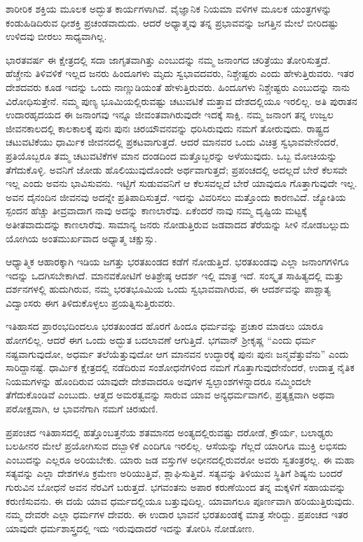 ಶಾರೀರಿಕ ಶಕ್ತಿಯ ಮೂಲಕ ಅದ್ಭುತ ಕಾರ್ಯಗಳಾಗಿವೆ. ವೈಜ್ಞಾನಿಕ ನಿಯಮಾ ವಳಿಗಳ ಮೂಲಕ ಯಂತ್ರಗಳನ್ನು ಕಂಡುಹಿಡಿದಿರುವ ಧೀಶಕ್ತಿ ಪ್ರಚಂಡವಾದುದು. ಆದರೆ ಅಧ್ಯಾತ್ಮವು ತನ್ನ ಪ್ರಭಾವವನ್ನು ಜಗತ್ತಿನ ಮೇಲೆ ಬೀರಿದಷ್ಟು ಉಳಿದವು ಬೀರಲು ಸಾಧ್ಯವಾಗಿಲ್ಲ. 

ಭಾರತವರ್ಷ ಈ ಕ್ಷೇತ್ರದಲ್ಲಿ ಸದಾ ಜಾಗೃತವಾಗಿತ್ತು ಎಂಬುದನ್ನು ನಮ್ಮ ಜನಾಂಗದ ಚರಿತ್ರೆಯು ತೋರಿಸುತ್ತದೆ. ಹೆಚ್ಚೇನು ತಿಳಿವಳಿಕೆ ಇಲ್ಲದ ಜನರು ಹಿಂದೂಗಳು ಮೃದು ಸ್ವಭಾವದವರು, ನಿಶ್ಚೇಷ್ಟರು ಎಂದು ಹೇಳುತ್ತಿರುವರು. ಇತರ ದೇಶದವರು ಕೂಡ ಇದನ್ನು ಒಂದು ನಾಣ್ಣುಡಿಯಂತೆ ಹೇಳುತ್ತಿರುವರು. ಹಿಂದೂಗಳು ನಿಶ್ಚೇಷ್ಟರು ಎಂಬುದನ್ನು ನಾನು ವಿರೋಧಿಸುತ್ತೇನೆ. ನಮ್ಮ ಪುಣ್ಯ ಭೂಮಿಯಲ್ಲಿರುವಷ್ಟು ಚಟುವಟಿಕೆ ಮತ್ತಾವ ದೇಶದಲ್ಲಿಯೂ ಇರಲಿಲ್ಲ. ಅತಿ ಪುರಾತನ ಉದಾರಹೃದಯದ ಈ ಜನಾಂಗವು ಇನ್ನೂ ಜೀವಂತವಾಗಿರುವುದೇ ಇದಕ್ಕೆ ಸಾಕ್ಷಿ. ನಮ್ಮ ಜನಾಂಗ ತನ್ನ ಉಜ್ವಲ ಜೀವನಕಾಲದಲ್ಲಿ ಕಾಲಕಾಲಕ್ಕೆ ಪುನಃ ಪುನಃ ಚಿರ\-ಯೌವನವನ್ನು ಧರಿಸಿರುವುದು ನಮಗೆ ತೋರುವುದು. ರಾಷ್ಟ್ರದ ಚಟುವಟಿಕೆಯು ಧಾರ್ಮಿಕ ಜೀವನದಲ್ಲಿ ಪ್ರಕಟವಾಗುತ್ತದೆ. ಆದರೆ ಮಾನವರ ಒಂದು ವಿಚಿತ್ರ ಸ್ವಭಾವವೇನೆಂದರೆ, ಪ್ರತಿಯೊಬ್ಬರೂ ತಮ್ಮ ಚಟುವಟಿಕೆಗಳ ಮಾನ ದಂಡದಿಂದ ಮತ್ತೊಬ್ಬರನ್ನು ಅಳೆಯುವುದು. ಒಬ್ಬ ಮೋಚಿಯನ್ನು ತೆಗೆದುಕೊಳ್ಳಿ. ಅವನಿಗೆ ಜೋಡು ಹೊಲಿಯುವುದೊಂದೇ ಅರ್ಥವಾಗುತ್ತದೆ; ಪ್ರಪಂಚದಲ್ಲಿ ಅದಲ್ಲದೆ ಬೇರೆ ಕೆಲಸವೇ ಇಲ್ಲ ಎಂದು ಅವನು ಭಾವಿಸುವನು. ಇಟ್ಟಿಗೆ ಸುಡುವವನಿಗೆ ಆ ಕೆಲಸವಲ್ಲದೆ ಬೇರೆ ಯಾವುದೂ ಗೊತ್ತಾಗುವುದೇ ಇಲ್ಲ. ಅವನ ದೈನಂದಿನ ಜೀವನವು ಅದನ್ನೇ ಪ್ರತಿಪಾದಿಸುತ್ತದೆ. ಇದನ್ನು ವಿವರಿಸಲು ಮತ್ತೊಂದು ಕಾರಣವಿದೆ. ಜ್ಯೋತಿಯ ಸ್ಪಂದನ ಹೆಚ್ಚು ತೀವ್ರವಾದಾಗ ನಾವು ಅದನ್ನು ಕಾಣಲಾರೆವು. ಏಕೆಂದರೆ ನಾವು ನಮ್ಮ ದೃಷ್ಟಿಯ ಮಟ್ಟಕ್ಕೆ ಅತೀತವಾದುದನ್ನು ಕಾಣಲಾರೆವು. ಸಾಮಾನ್ಯ ಜನರು ನೋಡುತ್ತಿರುವ ಜಡವಾದದ ತೆರೆಯನ್ನು ಸೀಳಿ ನೋಡಬಲ್ಲುದು ಯೋಗಿಯ ಅಂತಮುರ್ಖವಾದ ಅಧ್ಯಾತ್ಮ ಚಕ್ಷುಸ್ಸು. 

ಆಧ್ಯಾತ್ಮಿಕ ಆಹಾರಕ್ಕಾಗಿ ಇಡಿಯ ಜಗತ್ತು ಭರತಖಂಡದ ಕಡೆಗೆ ನೋಡುತ್ತಿದೆ. ಭರತಖಂಡವು ಎಲ್ಲಾ ಜನಾಂಗಗಳಿಗೂ ಇದನ್ನು ಒದಗಿಸಬೇಕಾಗಿದೆ. ಮಾನವಕೋಟಿಗೆ ಅತಿಶ್ರೇಷ್ಠ ಆದರ್ಶ ಇಲ್ಲಿ ಮಾತ್ರ ಇದೆ. ಸಂಸ್ಕೃತ ಸಾಹಿತ್ಯದಲ್ಲಿ ಮತ್ತು ದರ್ಶನಗಳಲ್ಲಿ ಹುದುಗಿರುವ, ನಮ್ಮ ಭರತಭೂಮಿಯ ಒಂದು ಸ್ವಭಾವವಾಗಿರುವ, ಈ ಆದರ್ಶವನ್ನು ಪಾಶ್ಚಾತ್ಯ ವಿದ್ವಾಂಸರು ಈಗ ತಿಳಿದುಕೊಳ್ಳಲು ಪ್ರಯತ್ನಿ\-ಸುತ್ತಿರುವರು. 

ಇತಿಹಾಸದ ಪ್ರಾರಂಭದಿಂದಲೂ ಭರತಖಂಡದ ಹೊರಗೆ ಹಿಂದೂ ಧರ್ಮವನ್ನು ಪ್ರಚಾರ ಮಾಡಲು ಯಾರೂ ಹೋಗಲಿಲ್ಲ. ಆದರೆ ಈಗ ಒಂದು ಅದ್ಭುತ ಬದಲಾವಣೆ ಆಗುತ್ತಿದೆ. ಭಗವಾನ್​ ಶ‍್ರೀಕೃಷ್ಣ “ಎಂದು ಧರ್ಮ ನಷ್ಟ\-ವಾಗು\-ವುದೋ, ಅಧರ್ಮ ತಲೆಯೆತ್ತುವುದೋ ಆಗ ಮಾನವನ ಉದ್ಧಾರಕ್ಕೆ ಪುನಃ ಪುನಃ ಜನ್ಮವೆತ್ತುವೆನು” ಎಂದು ಸಾರಿದ್ದಾನಷ್ಟೆ. ಧಾರ್ಮಿಕ ಕ್ಷೇತ್ರದಲ್ಲಿ ನಡೆದಿರುವ ಸಂಶೋಧನೆಗಳಿಂದ ನಮಗೆ ಗೊತ್ತಾಗುವುದೇನೆಂದರೆ, ಉದಾತ್ತ ನೈತಿಕ ನಿಯಮ\-ಗಳನ್ನು ಹೊಂದಿರುವ ಯಾವುದೇ ದೇಶವಾದರೂ ಅವುಗಳ ಸ್ವಲ್ಪಾಂಶಗಳನ್ನಾದರೂ ನಮ್ಮಿಂದಲೇ ತೆಗೆದುಕೊಂಡಿವೆ ಎಂಬುದು. ಆತ್ಮದ ಅಮರತ್ವವನ್ನು ಸಾರುವ ಯಾವ ಅನ್ಯಧರ್ಮವಾಗಲಿ, ಪ್ರತ್ಯಕ್ಷವಾಗಿ ಅಥವಾ ಪರೋಕ್ಷವಾಗಿ, ಆ ಭಾವನೆಗಾಗಿ ನಮಗೆ ಚಿರಋಣಿ. 

ಪ್ರಪಂಚದ ಇತಿಹಾಸದಲ್ಲಿ ಹತ್ತೊಂಬತ್ತನೆಯ ಶತಮಾನದ ಅಂತ್ಯದಲ್ಲಿರುವಷ್ಟು ದರೋಡೆ, ಕ್ರೌರ್ಯ, ಬಲಾಢ್ಯರು ಬಲಹೀನರ ಮೇಲೆ ಪ್ರಯೋಗಿಸುವ ದಬ್ಬಾಳಿಕೆ ಎಂದಿಗೂ ಇರಲಿಲ್ಲ. ಆಸೆಯನ್ನು ಗೆಲ್ಲದೆ ಯಾರಿಗೂ ಮುಕ್ತಿ ಲಭಿಸದು ಎಂಬುದನ್ನು ಎಲ್ಲರೂ ಅರಿಯಬೇಕು. ಯಾರು ಜಡ ವಸ್ತುಗಳ ಅಧೀನದಲ್ಲಿರುವರೋ ಅವರು ಸ್ವತಂತ್ರರಲ್ಲ. ಈ ಮಹಾ ಸತ್ಯವನ್ನು ಎಲ್ಲಾ ದೇಶಗಳೂ ಕ್ರಮೇಣ ಅರಿಯುತ್ತಿವೆ, ಶ್ಲಾಘಿಸುತ್ತಿವೆ. ಸತ್ಯವನ್ನು ತಿಳಿಯುವ ಸ್ಥಿತಿಗೆ ಶಿಷ್ಯನು ಬಂದರೆ ಗುರುವಿನ ಬೋಧನೆ ಅವನ ನೆರವಿಗೆ ಬರುತ್ತದೆ. ಭಗವಂತನು ಅಪಾರ ಕರುಣೆಯಿಂದ ತನ್ನ ಮಕ್ಕಳಿಗೆ ಸಹಾಯವನ್ನು ಕರುಣಿಸುವನು. ಈ ದಯೆ ಯಾವ ಧರ್ಮದಲ್ಲಿಯೂ ಬತ್ತುವುದಿಲ್ಲ. ಯಾವಾಗಲೂ ಪೂರ್ಣವಾಗಿ ಹರಿಯುತ್ತಿರುವುದು. ನಮ್ಮ ದೇವರೇ ಎಲ್ಲಾ ಧರ್ಮಗಳ ದೇವರು. ಈ ಉದಾರ ಭಾವನೆ ಭರತಖಂಡಕ್ಕೆ ಮಾತ್ರ ಸೇರಿದ್ದು. ಪ್ರಪಂಚದ ಇತರ ಯಾವುದೇ ಧರ್ಮಶಾಸ್ತ್ರದಲ್ಲಿ ಇದು ಇರುವುದಾದರೆ ಇದನ್ನು ತೋರಿಸಿ ನೋಡೋಣ. 

